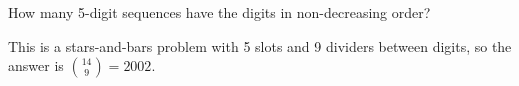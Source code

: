 \question How many 5-digit sequences have the digits in non-decreasing order?

\begin{solution}[.5 in]
This is a stars-and-bars problem with 5 slots and 9 dividers between 
digits, so the answer is ${14 \choose 9} = 2002$.
\end{solution}
